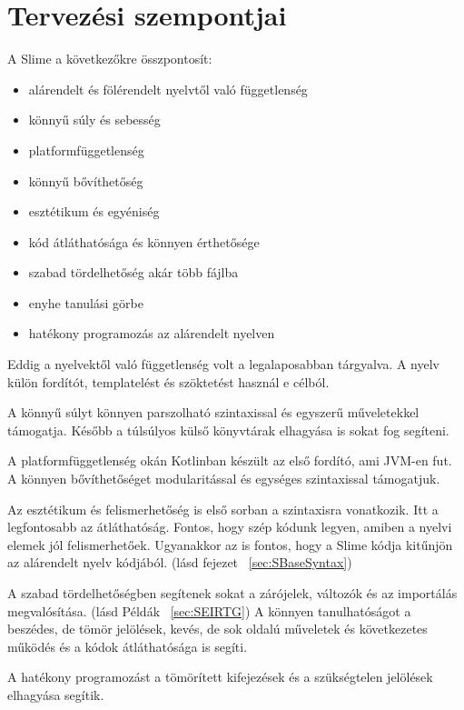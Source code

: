 \section{Tervezési szempontjai}
\label{sec:SDesign}
A Slime a következőkre összpontosít:
\begin{itemize}
\item alárendelt és fölérendelt nyelvtől való függetlenség
\item könnyű súly és sebesség
\item platformfüggetlenség
\item könnyű bővíthetőség
\item esztétikum és egyéniség
\item kód átláthatósága és könnyen érthetősége
\item szabad tördelhetőség akár több fájlba
\item enyhe tanulási görbe
\item hatékony programozás az alárendelt nyelven
\end{itemize}

Eddig a nyelvektől való függetlenség volt a legalaposabban tárgyalva. 
A nyelv külön fordítót, templatelést és szöktetést használ e célból.

A könnyű súlyt könnyen parszolható szintaxissal és egyszerű műveletekkel támogatja. 
Később a túlsúlyos külső könyvtárak elhagyása is sokat fog segíteni.

A platformfüggetlenség okán Kotlinban készült az első fordító, ami JVM-en fut. 
A könnyen bővíthetőséget modularitással és egységes szintaxissal támogatjuk.

Az esztétikum és felismerhetőség is első sorban a szintaxisra vonatkozik. 
Itt a legfontosabb az átláthatóság. 
Fontos, hogy szép kódunk legyen, amiben a nyelvi elemek jól felismerhetőek.
Ugyanakkor az is fontos, hogy a Slime kódja kitűnjön az alárendelt nyelv kódjából. (lásd fejezet ~\ref{sec:SBaseSyntax})

A szabad tördelhetőségben segítenek sokat a zárójelek, változók és az importálás megvalósítása. (lásd Példák ~\ref{sec:SEIRTG}) 
A könnyen tanulhatóságot a beszédes, de tömör jelölések, kevés, de sok oldalú műveletek és következetes működés és a kódok átláthatósága is segíti.

A hatékony programozást a tömörített kifejezések és a szükségtelen jelölések elhagyása segítik.

